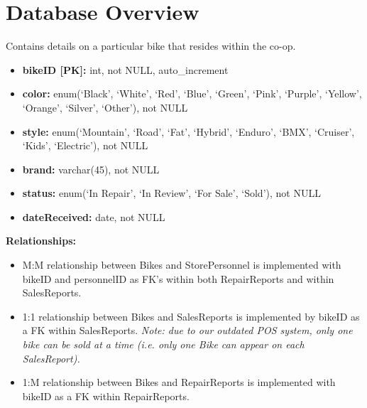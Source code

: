 \documentclass{article}
\begin{document}
\vspace{0.5cm}

\section{Database Overview}

\begin{tcolorbox}[colback=secondarycolor, colframe=primarycolor, title=\textbf{Bikes Table}]
Contains details on a particular bike that resides within the co-op.
\vspace{0.2cm}

\begin{itemize}
  \item \textbf{bikeID [PK]:} int, not NULL, auto\_increment
  \item \textbf{color:} enum(`Black', `White', `Red', `Blue', `Green', `Pink', `Purple', `Yellow', `Orange', `Silver', `Other'), not NULL 
  \item \textbf{style:} enum(`Mountain', `Road', `Fat', `Hybrid', `Enduro', `BMX', `Cruiser', `Kids', `Electric'), not NULL
  \item \textbf{brand:} varchar(45), not NULL
  \item \textbf{status:} enum(`In Repair', `In Review', `For Sale', `Sold'), not NULL
  \item \textbf{dateReceived:} date, not NULL
\end{itemize}
\vspace{0.2cm}

\textbf{Relationships:}
\vspace{0.2cm}
\begin{itemize}
  \item M:M relationship between Bikes and StorePersonnel is implemented with bikeID and personnelID as FK's within both RepairReports and within SalesReports.
  \item 1:1 relationship between Bikes and SalesReports is implemented by bikeID as a FK within SalesReports. \textit{Note: due to our outdated POS system, only one bike can be sold at a time (i.e. only one Bike can appear on each SalesReport).}
  \item 1:M relationship between Bikes and RepairReports is implemented with bikeID as a FK within RepairReports.
\end{itemize}
\end{tcolorbox}
\end{document}
